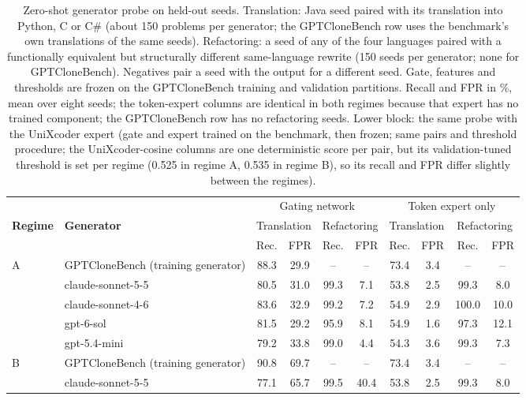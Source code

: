 \begin{table}[t]
\centering
\caption{Zero-shot generator probe on held-out seeds. Translation: Java seed paired with its translation into Python, C or C\# (about 150 problems per generator; the GPTCloneBench row uses the benchmark's own translations of the same seeds). Refactoring: a seed of any of the four languages paired with a functionally equivalent but structurally different same-language rewrite (150 seeds per generator; none for GPTCloneBench). Negatives pair a seed with the output for a different seed. Gate, features and thresholds are frozen on the GPTCloneBench training and validation partitions. Recall and FPR in \%, mean over eight seeds; the token-expert columns are identical in both regimes because that expert has no trained component; the GPTCloneBench row has no refactoring seeds. Lower block: the same probe with the UniXcoder expert (gate and expert trained on the benchmark, then frozen; same pairs and threshold procedure; the UniXcoder-cosine columns are one deterministic score per pair, but its validation-tuned threshold is set per regime (0.525 in regime A, 0.535 in regime B), so its recall and FPR differ slightly between the regimes).}
\label{tab:probe}
\scriptsize
\setlength{\tabcolsep}{3.5pt}
\begin{tabular}{ll|cc|cc|cc|cc}
\toprule
 & & \multicolumn{4}{c|}{Gating network} & \multicolumn{4}{c}{Token expert only} \\
\textbf{Regime} & \textbf{Generator} & \multicolumn{2}{c}{Translation} & \multicolumn{2}{c|}{Refactoring} & \multicolumn{2}{c}{Translation} & \multicolumn{2}{c}{Refactoring} \\
 & & Rec. & FPR & Rec. & FPR & Rec. & FPR & Rec. & FPR \\
\midrule
A & GPTCloneBench (training generator) & 88.3 & 29.9 & -- & -- & 73.4 & 3.4 & -- & -- \\
 & claude-sonnet-5-5 & 80.5 & 31.0 & 99.3 & 7.1 & 53.8 & 2.5 & 99.3 & 8.0 \\
 & claude-sonnet-4-6 & 83.6 & 32.9 & 99.2 & 7.2 & 54.9 & 2.9 & 100.0 & 10.0 \\
 & gpt-6-sol & 81.5 & 29.2 & 95.9 & 8.1 & 54.9 & 1.6 & 97.3 & 12.1 \\
 & gpt-5.4-mini & 79.2 & 33.8 & 99.0 & 4.4 & 54.3 & 3.6 & 99.3 & 7.3 \\
\midrule
B & GPTCloneBench (training generator) & 90.8 & 69.7 & -- & -- & 73.4 & 3.4 & -- & -- \\
 & claude-sonnet-5-5 & 77.1 & 65.7 & 99.5 & 40.4 & 53.8 & 2.5 & 99.3 & 8.0 \\

\end{tabular}
\end{table}
